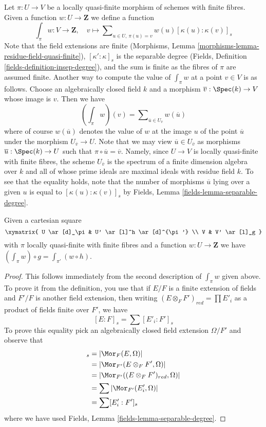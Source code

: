 \medskip\noindent
Let $\pi : U \to V$ be a locally quasi-finite morphism of schemes with
finite fibres. Given a function $w : U \to \mathbf{Z}$ we define a function
$$
\textstyle{\int}_\pi w : V \longrightarrow \mathbf{Z},\quad
v \longmapsto
\sum\nolimits_{u \in U,\ \pi(u) = v} w(u) [\kappa(u) : \kappa(v)]_s
$$
Note that the field extensions are finite
(Morphisms, Lemma \ref{morphisms-lemma-residue-field-quasi-finite}),
$[\kappa' : \kappa]_s$ is the separable degree
(Fields, Definition \ref{fields-definition-insep-degree}),
and the sum is finite as the fibres of $\pi$ are assumed finite.
Another way to compute the value of $\int_\pi w$ at a point $v \in V$
is as follows.
Choose an algebraically closed field $k$ and a morphism
$\overline{v} : \Spec(k) \to V$ whose image is $v$. Then we have
$$
(\textstyle{\int}_\pi w)(v) =
\sum\nolimits_{\overline{u} \in U_{\overline{v}}} w(\overline{u})
$$
where of course $w(\overline{u})$ denotes the value of $w$ at the
image $u$ of the point $\overline{u}$ under the morphism
$U_{\overline{v}} \to U$.
Note that we may view $\overline{u} \in U_{\overline{v}}$ as morphisms
$\overline{u} : \Spec(k) \to U$ such that
$\pi \circ \overline{u} = \overline{v}$. Namely, since
$U \to V$ is locally quasi-finite with finite fibres,
the scheme $U_{\overline{v}}$ is the spectrum
of a finite dimension algebra over $k$ and all of whose prime ideals
are maximal ideals with residue field $k$. To see that the equality
holds, note that the number of morphisms $\overline{u}$ lying over
a given $u$ is equal to $[\kappa(u) : \kappa(v)]_s$ by
Fields, Lemma \ref{fields-lemma-separable-degree}.

\begin{lemma}
\label{lemma-weighting-check-after-etale-base-change}
Given a cartesian square
$$
\xymatrix{
U \ar[d]_\pi & U' \ar[l]^h \ar[d]^{\pi'} \\
V & V' \ar[l]_g
}
$$
with $\pi$ locally quasi-finite with finite fibres
and a function $w : U \to \mathbf{Z}$
we have $(\int_\pi w) \circ g = \int_{\pi'} (w \circ h)$.
\end{lemma}

\begin{proof}
This follows immediately from the second description of $\int_\pi w$
given above. To prove it from the definition, you use that if
$E/F$ is a finite extension of fields and $F'/F$ is another field extension,
then writing $(E \otimes_F F')_{red} = \prod E'_i$ as a product of fields
finite over $F'$, we have
$$
[E : F]_s = \sum [E'_i : F']_s
$$
To prove this equality pick an algebraically closed field
extension $\Omega/F'$ and observe that
\begin{align*}
[E : F]_s
& =
|\Mor_F(E, \Omega)| \\
& =
|\Mor_{F'}(E \otimes_F F', \Omega)| \\
& =
|\Mor_{F'}((E \otimes_F F')_{red}, \Omega)| \\
& =
\sum |\Mor_{F'}(E'_i, \Omega)| \\
& =
\sum [E'_i : F']_s
\end{align*}
where we have used Fields, Lemma \ref{fields-lemma-separable-degree}.
\end{proof}

